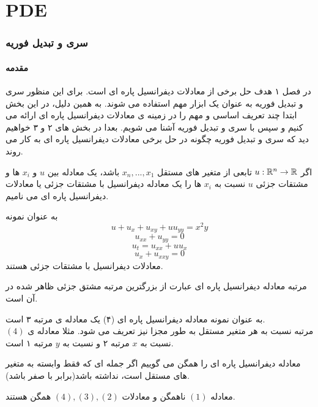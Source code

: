 \part{PDE}
\section{سری و تبدیل فوریه}
\subsection*{مقدمه}
در فصل ۱ هدف حل برخی از معادلات دیفرانسیل پاره ای است. برای این منظور سری و تبدیل فوریه به عنوان یک ابزار مهم استفاده می شوند. به همین دلیل، در این بخش ابتدا چند تعریف اساسی و مهم را در زمینه ی معادلات دیفرانسیل پاره ای ارائه می کنیم و سپس با سری و تبدیل فوریه آشنا می شویم. بعدا در بخش های ۲ و ۳ خواهیم دید که سری و تبدیل فوریه چگونه در حل برخی معادلات دیفرانسیل پاره ای به کار می روند.\\
\begin{definition}
	اگر 
	$u:\mathbb{R}^n \to \mathbb{R}$
	تابعی از متغیر های مستقل
	$x_n,...,x_1$
	باشد، یک معادله بین 
	$u$
	و 
	$x_i$
	ها و مشتقات جزئی
	$u$
	نسبت به
	$x_i$
	ها را یک معادله دیفرانسیل با مشتقات جزئی یا معادلات دیفرانسیل پاره ای می نامیم.\\
\end{definition}
به عنوان نمونه
\begin{equation}
	u+u_x+u_{xy}+uu_{yy}=x^2y
\end{equation}
\begin{equation}
	u_{xx}+u_{yy}=0
\end{equation}
\begin{equation}
	u_t=u_{xx}+uu_x
\end{equation}
\begin{equation}
	u_x+u_{xxy}=0
\end{equation}
معادلات دیفرانسیل با مشتقات جزئی هستند.\\
\begin{definition}
	مرتبه معادله دیفرانسیل پاره ای عبارت از بزرگترین مرتبه مشتق جزئی ظاهر شده در آن است.
\end{definition}
به عنوان نمونه معادله دیفرانسیل پاره ای (۴) یک معادله ی مرتبه ۳ است.\\
مرتبه نسبت به هر متغیر مستقل به طور مجزا نیز تعریف می شود. مثلا معادله ی 
$(4)$
نسبت به 
$x$
مرتبه ۲ و نسبت به 
$y$
مرتبه ۱ است.\\

\begin{definition}
	معادله دیفرانسیل پاره ای را همگن می گوییم اگر جمله ای که فقط وابسته به متغیر های مستقل است، نداشته باشد(برابر با صفر باشد).\\
\end{definition}
معادله
$(1)$
ناهمگن و معادلات
$(4),(3),(2)$
همگن هستند.\\

